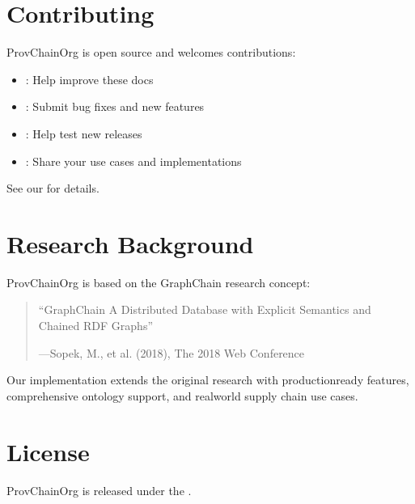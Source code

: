 \documentclass[letterpaper,10pt,english]{sphinxmanual}
\begin{document}
\chapter{Contributing}
\label{\detokenize{index:contributing}}
\sphinxAtStartPar
ProvChainOrg is open source and welcomes contributions:
\begin{itemize}
\item {} 
\sphinxAtStartPar
{}: Help improve these docs

\item {} 
\sphinxAtStartPar
{}: Submit bug fixes and new features

\item {} 
\sphinxAtStartPar
{}: Help test new releases

\item {} 
\sphinxAtStartPar
{}: Share your use cases and implementations

\end{itemize}

\sphinxAtStartPar
See our  for details.


\chapter{Research Background}
\label{\detokenize{index:research-background}}
\sphinxAtStartPar
ProvChainOrg is based on the GraphChain research concept:
\begin{quote}

\sphinxAtStartPar
“GraphChain \textendash{} A Distributed Database with Explicit Semantics and Chained RDF Graphs”

\begin{flushright}
---Sopek, M., et al. (2018), The 2018 Web Conference
\end{flushright}
\end{quote}

\sphinxAtStartPar
Our implementation extends the original research with production\sphinxhyphen{}ready features, comprehensive ontology support, and real\sphinxhyphen{}world supply chain use cases.


\chapter{License}
\label{\detokenize{index:license}}
\sphinxAtStartPar
ProvChainOrg is released under the .





\renewcommand{\indexname}{Index}
\printindex
\end{document}
